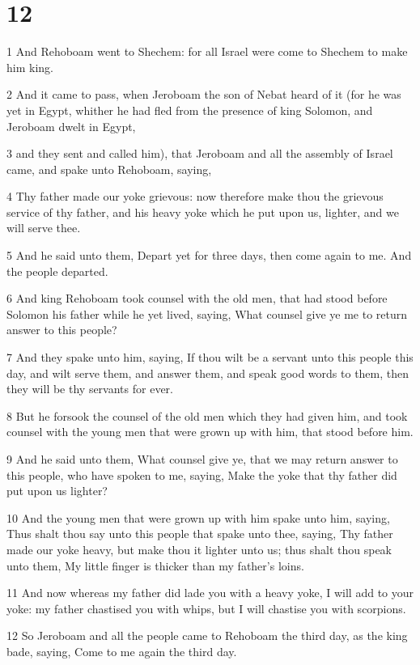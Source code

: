 \chapter{12}

\par 1 And Rehoboam went to Shechem: for all Israel were come to Shechem to make him king.
\par 2 And it came to pass, when Jeroboam the son of Nebat heard of it (for he was yet in Egypt, whither he had fled from the presence of king Solomon, and Jeroboam dwelt in Egypt,
\par 3 and they sent and called him), that Jeroboam and all the assembly of Israel came, and spake unto Rehoboam, saying,
\par 4 Thy father made our yoke grievous: now therefore make thou the grievous service of thy father, and his heavy yoke which he put upon us, lighter, and we will serve thee.
\par 5 And he said unto them, Depart yet for three days, then come again to me. And the people departed.
\par 6 And king Rehoboam took counsel with the old men, that had stood before Solomon his father while he yet lived, saying, What counsel give ye me to return answer to this people?
\par 7 And they spake unto him, saying, If thou wilt be a servant unto this people this day, and wilt serve them, and answer them, and speak good words to them, then they will be thy servants for ever.
\par 8 But he forsook the counsel of the old men which they had given him, and took counsel with the young men that were grown up with him, that stood before him.
\par 9 And he said unto them, What counsel give ye, that we may return answer to this people, who have spoken to me, saying, Make the yoke that thy father did put upon us lighter?
\par 10 And the young men that were grown up with him spake unto him, saying, Thus shalt thou say unto this people that spake unto thee, saying, Thy father made our yoke heavy, but make thou it lighter unto us; thus shalt thou speak unto them, My little finger is thicker than my father's loins.
\par 11 And now whereas my father did lade you with a heavy yoke, I will add to your yoke: my father chastised you with whips, but I will chastise you with scorpions.
\par 12 So Jeroboam and all the people came to Rehoboam the third day, as the king bade, saying, Come to me again the third day.
